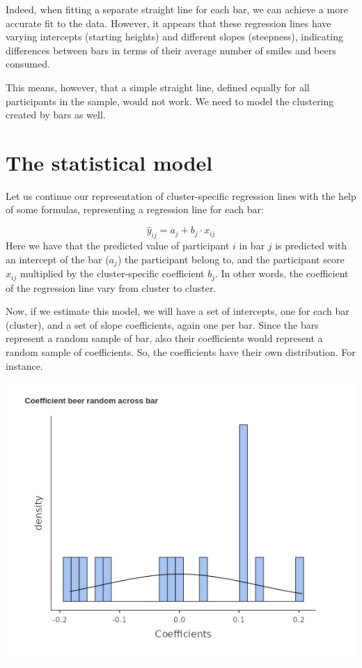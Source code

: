 \documentclass[
]{book}
\begin{document}
Indeed, when fitting a separate straight line for each bar, we can achieve a more accurate fit to the data. However, it appears that these regression lines have varying intercepts (starting heights) and different slopes (steepness), indicating differences between bars in terms of their average number of smiles and beers consumed.

This means, however, that a simple straight line, defined equally for all participants in the sample, would not work. We need to model the clustering created by bars as well.

\hypertarget{the-statistical-model}{%
\section{The statistical model}\label{the-statistical-model}}

Let us continue our representation of cluster-specific regression lines with the help of some formulas, representing a regression line for each bar:

\[ 
\hat{y}_{ij}=a_j+ b_j \cdot x_{ij}
\]
Here we have that the predicted value of participant \(i\) in bar \(j\) is predicted with an intercept of the bar (\(a_j\)) the participant belong to, and the participant score \(x_{ij}\) multiplied by the cluster-specific coefficient \(b_{j}\). In other words, the coefficient of the regression line vary from cluster to cluster.

Now, if we estimate this model, we will have a set of intercepts, one for each bar (cluster), and a set of slope coefficients, again one per bar. Since the bars represent a random sample of bar, also their coefficients would represent a random sample of coefficients. So, the coefficients have their own distribution. For instance.

\includegraphics[width=0.8\linewidth]{bookletpics/4_theory_plot4}
\end{document}
